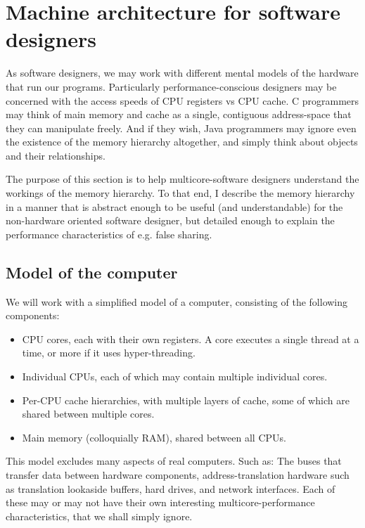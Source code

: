 \chapter{Machine architecture for software designers}
\label{chap:arch}
As software designers, we may work with different mental models of the hardware
that run our programs. Particularly performance-conscious designers may be
concerned with the access speeds of CPU registers vs CPU cache. C programmers
may think of main memory and cache as a single, contiguous address-space that
they can manipulate freely. And if they wish, Java programmers may ignore even
the existence of the memory hierarchy altogether, and simply think about objects
and their relationships.

The purpose of this section is to help multicore-software designers understand the
workings of the memory hierarchy. To that end, I describe the memory hierarchy
in a manner that is abstract enough to be useful (and understandable) for the
non-hardware oriented software designer, but detailed enough to explain the
performance characteristics of e.g. false sharing.

\section{Model of the computer}
We will work with a simplified model of a computer, consisting of the following
components:

\begin{itemize}
	\item CPU cores, each with their own registers. A core executes a single
		thread at a time, or more if it uses hyper-threading.
	\item Individual CPUs, each of which may contain multiple individual cores.
	\item Per-CPU cache hierarchies, with multiple layers of cache,
		some of which are shared between multiple cores.
	\item Main memory (colloquially RAM), shared between all CPUs.
\end{itemize}


This model excludes many aspects of real computers. Such as: The buses that
transfer data between hardware components, address-translation hardware such as
translation lookaside buffers, hard drives, and network interfaces. Each of
these may or may not have their own interesting multicore-performance
characteristics, that we shall simply ignore.

